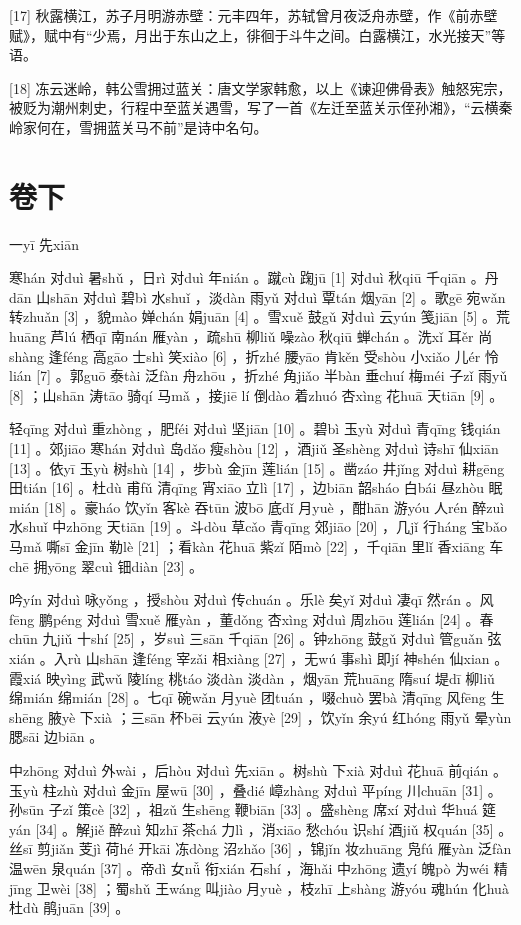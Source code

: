 \documentclass[12pt,UTF8]{ctexbook}
\begin{document}
[17] 秋露横江，苏子月明游赤壁：元丰四年，苏轼曾月夜泛舟赤壁，作《前赤壁赋》，赋中有“少焉，月出于东山之上，徘徊于斗牛之间。白露横江，水光接天”等语。

[18] 冻云迷岭，韩公雪拥过蓝关：唐文学家韩愈，以上《谏迎佛骨表》触怒宪宗，被贬为潮州刺史，行程中至蓝关遇雪，写了一首《左迁至蓝关示侄孙湘》，“云横秦岭家何在，雪拥蓝关马不前”是诗中名句。





\part{卷下}


一yī 先xiān


寒hán 对duì 暑shǔ ，日rì 对duì 年nián 。蹴cù 踘jū [1] 对duì 秋qiū 千qiān 。丹dān 山shān 对duì 碧bì 水shuǐ ，淡dàn 雨yǔ 对duì 覃tán 烟yān [2] 。歌gē 宛wǎn 转zhuǎn [3] ，貌mào 婵chán 娟juān [4] 。雪xuě 鼓gǔ 对duì 云yún 笺jiān [5] 。荒huāng 芦lú 栖qī 南nán 雁yàn ，疏shū 柳liǔ 噪zào 秋qiū 蝉chán 。洗xǐ 耳ěr 尚shàng 逢féng 高gāo 士shì 笑xiào [6] ，折zhé 腰yāo 肯kěn 受shòu 小xiǎo 儿ér 怜lián [7] 。郭guō 泰tài 泛fàn 舟zhōu ，折zhé 角jiǎo 半bàn 垂chuí 梅méi 子zǐ 雨yǔ [8] ；山shān 涛tāo 骑qí 马mǎ ，接jiē lí 倒dào 着zhuó 杏xìng 花huā 天tiān [9] 。

轻qīng 对duì 重zhòng ，肥féi 对duì 坚jiān [10] 。碧bì 玉yù 对duì 青qīng 钱qián [11] 。郊jiāo 寒hán 对duì 岛dǎo 瘦shòu [12] ，酒jiǔ 圣shèng 对duì 诗shī 仙xiān [13] 。依yī 玉yù 树shù [14] ，步bù 金jīn 莲lián [15] 。凿záo 井jǐng 对duì 耕gēng 田tián [16] 。杜dù 甫fǔ 清qīng 宵xiāo 立lì [17] ，边biān 韶sháo 白bái 昼zhòu 眠mián [18] 。豪háo 饮yǐn 客kè 吞tūn 波bō 底dǐ 月yuè ，酣hān 游yóu 人rén 醉zuì 水shuǐ 中zhōng 天tiān [19] 。斗dòu 草cǎo 青qīng 郊jiāo [20] ，几jǐ 行háng 宝bǎo 马mǎ 嘶sī 金jīn 勒lè [21] ；看kàn 花huā 紫zǐ 陌mò [22] ，千qiān 里lǐ 香xiāng 车chē 拥yōng 翠cuì 钿diàn [23] 。

吟yín 对duì 咏yǒng ，授shòu 对duì 传chuán 。乐lè 矣yǐ 对duì 凄qī 然rán 。风fēng 鹏péng 对duì 雪xuě 雁yàn ，董dǒng 杏xìng 对duì 周zhōu 莲lián [24] 。春chūn 九jiǔ 十shí [25] ，岁suì 三sān 千qiān [26] 。钟zhōng 鼓gǔ 对duì 管guǎn 弦xián 。入rù 山shān 逢féng 宰zǎi 相xiàng [27] ，无wú 事shì 即jí 神shén 仙xian 。霞xiá 映yìng 武wǔ 陵líng 桃táo 淡dàn 淡dàn ，烟yān 荒huāng 隋suí 堤dī 柳liǔ 绵mián 绵mián [28] 。七qī 碗wǎn 月yuè 团tuán ，啜chuò 罢bà 清qīng 风fēng 生shēng 腋yè 下xià ；三sān 杯bēi 云yún 液yè [29] ，饮yǐn 余yú 红hóng 雨yǔ 晕yùn 腮sāi 边biān 。

中zhōng 对duì 外wài ，后hòu 对duì 先xiān 。树shù 下xià 对duì 花huā 前qián 。玉yù 柱zhù 对duì 金jīn 屋wū [30] ，叠dié 嶂zhàng 对duì 平píng 川chuān [31] 。孙sūn 子zǐ 策cè [32] ，祖zǔ 生shēng 鞭biān [33] 。盛shèng 席xí 对duì 华huá 筵yán [34] 。解jiě 醉zuì 知zhī 茶chá 力lì ，消xiāo 愁chóu 识shí 酒jiǔ 权quán [35] 。丝sī 剪jiǎn 芰jì 荷hé 开kāi 冻dòng 沼zhǎo [36] ，锦jǐn 妆zhuāng 凫fú 雁yàn 泛fàn 温wēn 泉quán [37] 。帝dì 女nǚ 衔xián 石shí ，海hǎi 中zhōng 遗yí 魄pò 为wéi 精jīng 卫wèi [38] ；蜀shǔ 王wáng 叫jiào 月yuè ，枝zhī 上shàng 游yóu 魂hún 化huà 杜dù 鹃juān [39] 。
\end{document}
